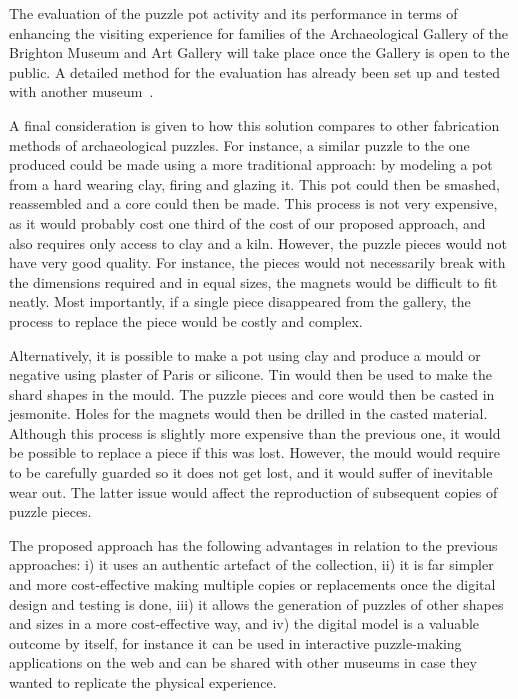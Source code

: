 \documentclass[acmlarge,screen,dvipsnames]{acmart}
\begin{document}
The evaluation of the puzzle pot activity and its performance in terms
of enhancing the visiting experience for families of the
Archaeological Gallery of the Brighton Museum and Art Gallery will
take place once the Gallery is open to the public. A detailed method
for the evaluation has already been set up and tested with another
museum~\cite{Samaroudi2017}.

A final consideration is given to how this solution compares to other
fabrication methods of archaeological puzzles. For instance, a similar
puzzle to the one produced could be made using a more traditional
approach: by modeling a pot from a hard wearing clay, firing and
glazing it. This pot could then be smashed, reassembled and a core
could then be made. This process is not very expensive, as it would
probably cost one third of the cost of our proposed approach, and also
requires only access to clay and a kiln. However, the puzzle pieces
would not have very good quality. For instance, the pieces would not
necessarily break with the dimensions required and in equal sizes, the
magnets would be difficult to fit neatly. Most importantly, if a
single piece disappeared from the gallery, the process to replace the
piece would be costly and complex.

Alternatively, it is possible to make a pot using clay and produce a
mould or negative using plaster of Paris or silicone. Tin would then
be used to make the shard shapes in the mould. The puzzle pieces and
core would then be casted in jesmonite. Holes for the magnets would
then be drilled in the casted material. Although this process is
slightly more expensive than the previous one, it would be possible to
replace a piece if this was lost. However, the mould would require to
be carefully guarded so it does not get lost, and it would suffer of
inevitable wear out. The latter issue would affect the reproduction of
subsequent copies of puzzle pieces.

The proposed approach has the following advantages in relation to the
previous approaches: i) it uses an authentic artefact of the
collection, ii) it is far simpler and more cost-effective making
multiple copies or replacements once the digital design and testing is
done, iii) it allows the generation of puzzles of other shapes and
sizes in a more cost-effective way, and iv) the digital model is a
valuable outcome by itself, for instance it can be used in interactive
puzzle-making applications on the web and can be shared with other
museums in case they wanted to replicate the physical experience.
\end{document}
